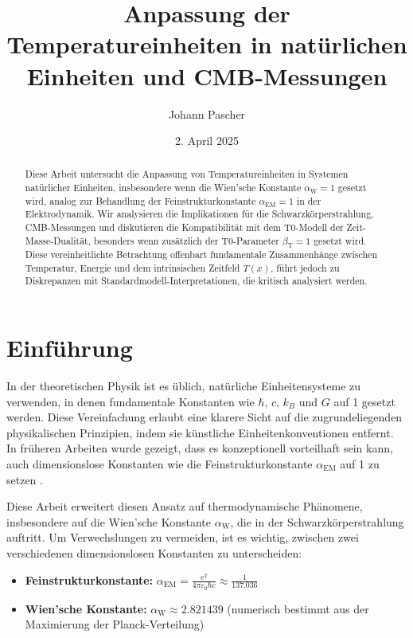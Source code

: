 \documentclass[12pt,a4paper]{article}
\newcommand{\Tfield}{T(x)}
\newcommand{\betaT}{\beta_{\text{T}}}
\newcommand{\alphaEM}{\alpha_{\text{EM}}}
\newcommand{\alphaW}{\alpha_{\text{W}}}
\begin{document}
	
	\title{Anpassung der Temperatureinheiten in natürlichen Einheiten und CMB-Messungen}
	\author{Johann Pascher}
	\date{2. April 2025}
	
	\maketitle
	
	\begin{abstract}
		Diese Arbeit untersucht die Anpassung von Temperatureinheiten in Systemen natürlicher Einheiten, insbesondere wenn die Wien'sche Konstante \(\alphaW = 1\) gesetzt wird, analog zur Behandlung der Feinstrukturkonstante \(\alphaEM = 1\) in der Elektrodynamik. Wir analysieren die Implikationen für die Schwarzkörperstrahlung, CMB-Messungen und diskutieren die Kompatibilität mit dem T0-Modell der Zeit-Masse-Dualität, besonders wenn zusätzlich der T0-Parameter \(\betaT = 1\) gesetzt wird. Diese vereinheitlichte Betrachtung offenbart fundamentale Zusammenhänge zwischen Temperatur, Energie und dem intrinsischen Zeitfeld \(\Tfield\), führt jedoch zu Diskrepanzen mit Standardmodell-Interpretationen, die kritisch analysiert werden.
	\end{abstract}
	
	\tableofcontents
	\newpage
	
	\section{Einführung}
	
	In der theoretischen Physik ist es üblich, natürliche Einheitensysteme zu verwenden, in denen fundamentale Konstanten wie \(\hbar\), \(c\), \(k_B\) und \(G\) auf 1 gesetzt werden. Diese Vereinfachung erlaubt eine klarere Sicht auf die zugrundeliegenden physikalischen Prinzipien, indem sie künstliche Einheitenkonventionen entfernt. In früheren Arbeiten wurde gezeigt, dass es konzeptionell vorteilhaft sein kann, auch dimensionslose Konstanten wie die Feinstrukturkonstante \(\alphaEM\) auf 1 zu setzen \cite{pascher_alpha_2025}.
	
	Diese Arbeit erweitert diesen Ansatz auf thermodynamische Phänomene, insbesondere auf die Wien'sche Konstante \(\alphaW\), die in der Schwarzkörperstrahlung auftritt. Um Verwechslungen zu vermeiden, ist es wichtig, zwischen zwei verschiedenen dimensionslosen Konstanten zu unterscheiden:
	
	\begin{tcolorbox}[colback=blue!5!white,colframe=blue!75!black,title=Wichtige dimensionslose Konstanten]
		\begin{itemize}
			\item \textbf{Feinstrukturkonstante:} \(\alphaEM = \frac{e^2}{4\pi\varepsilon_0 \hbar c} \approx \frac{1}{137.036}\)
			\item \textbf{Wien'sche Konstante:} \(\alphaW \approx 2.821439\) (numerisch bestimmt aus der Maximierung der Planck-Verteilung)
		\end{itemize}
	\end{tcolorbox}
	
\end{document}
